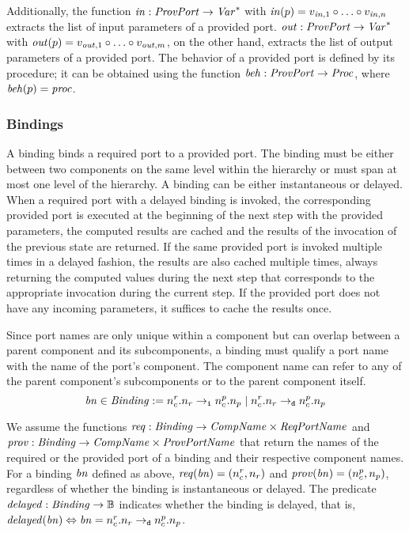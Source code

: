 \documentclass[a4paper,10pt,english]{article}
\begin{document}
Additionally, the function $\mathit{in} : \mathit{ProvPort} \rightarrow \mathit{Var}^*$ with $\mathit{in}(p) = v_{\mathit{in}, 1} \circ
\ldots \circ v_{\mathit{in}, n}$ extracts the list of input parameters of a provided port. $\mathit{out} : \mathit{ProvPort} \rightarrow
\mathit{Var}^*$ with $\mathit{out}(p) = v_{\mathit{out}, 1} \circ \ldots \circ v_{\mathit{out}, m}$, on the other hand,
extracts the list of output parameters of a provided port. The behavior of a provided port is defined by its procedure; it can be
obtained using the function $\mathit{beh} : \mathit{ProvPort} \rightarrow
\mathit{Proc}$, where $\mathit{beh}(p) = \mathit{proc}$.

\subsubsection{Bindings}
A binding binds a required port to a provided port. The binding must be either between two components on the
same level within the hierarchy or must span at most one level of the hierarchy. A binding can be either
instantaneous or delayed. When a required port with a delayed binding is invoked, the corresponding provided port is executed
at the beginning of the next step with the provided parameters, the computed results are cached and the results of the invocation
of the previous state are returned. If the same provided port is invoked multiple times in a delayed fashion, the results are also
cached multiple times, always returning the computed values during the next step that corresponds to the appropriate invocation
during the current step. If the provided port does not have any incoming parameters, it suffices to cache the results once.

Since port names are only unique within a component but can overlap between a parent component and its subcomponents, a
binding must qualify a port name with the name of the port's component. The component name can refer to any of the parent
component's subcomponents or to the parent component itself.
\begin{equation*} 
	\mathit{bn} \in \mathit{Binding} :=
		n_c^r\mathtt{.}n_r \; \mathtt{\rightarrow_i} \; n_c^p\mathtt{.}n_p
		\mid
		n_c^r\mathtt{.}n_r \; \mathtt{\rightarrow_d} \; n_c^p\mathtt{.}n_p
\end{equation*}

We assume the functions $\mathit{req} : \mathit{Binding} \rightarrow \mathit{CompName} \times \mathit{ReqPortName}$ and $\mathit{prov} : \mathit{Binding} \rightarrow \mathit{CompName}
\times \mathit{ProvPortName}$ that return the names of the required or the provided port of a binding and their respective component
names.
For a binding $\mathit{bn}$ defined as above, $\mathit{req}(\mathit{bn}) = (n_c^r, n_r)$ and $\mathit{prov}(\mathit{bn}) = (n_c^p,
n_p)$, regardless of whether the binding is instantaneous or delayed. The predicate $\mathit{delayed} : \mathit{Binding} \rightarrow
\mathbb{B}$ indicates whether the binding is delayed, that is, $\mathit{delayed}(\mathit{bn}) \Leftrightarrow \mathit{bn} =
n_c^r\mathtt{.}n_r \; \mathtt{\rightarrow_d} \; n_c^p\mathtt{.}n_p$.
\end{document}
